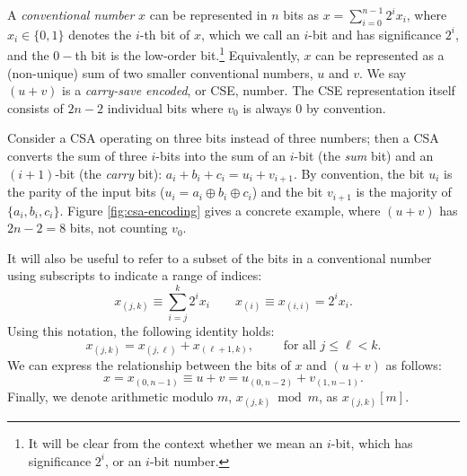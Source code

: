 \documentclass[twoside]{article}
\begin{document}
A \emph{conventional number} $x$ can be represented in $n$ bits as
$x = \sum_{i=0}^{n-1} 2^i x_i$,
where $x_i \in \{0,1\}$ denotes the $i$-th bit of $x$, which we call
an $i$-bit and has significance $2^i$, and the $0-$th bit is the low-order bit.\footnote{It will be clear from the context whether we mean an
$i$-bit, which has significance $2^i$, or an $i$-bit number.}
Equivalently, $x$ can be represented as a (non-unique)
sum of two smaller conventional numbers, $u$ and $v$.
We say $(u+v)$ is a \emph{carry-save encoded}, or CSE, number.
The CSE representation itself consists of $2n-2$ individual
bits where $v_0$ is always $0$ by convention.

Consider a CSA operating on three bits instead of three numbers; 
then a CSA converts the sum of three
$i$-bits into the sum of an $i$-bit (the \emph{sum} bit) and an $(i+1)$-bit
(the \emph{carry} bit):
$a_i+b_i+c_i = u_i+v_{i+1}$.
By convention, the bit $u_i$ is the parity of the input bits
($u_i = a_i \oplus b_i \oplus c_i$) and
the bit $v_{i+1}$ is the majority of $\{a_i, b_i, c_i\}$.
Figure \ref{fig:csa-encoding} gives a concrete example, where
$(u+v)$ has $2n-2 = 8$ bits, not counting $v_0$.

%
It will also be useful to refer to a subset of the bits in a conventional
number using subscripts to indicate a range of indices:
\begin{equation}
x_{(j,k)} \equiv \sum_{i=j}^k 2^ix_i \qquad
x_{(i)} \equiv x_{(i,i)} = 2^ix_i.
\end{equation}
%
Using this notation, the following identity holds:
\begin{equation}
x_{(j,k)} = x_{(j,\ell)} + x_{(\ell+1,k)}, \qquad \text{ for all } j \le \ell < k.
\end{equation}
%
We can express the relationship between the bits of $x$ and $(u+v)$ as follows:
%
\begin{equation}
x = x_{(0,n-1)} \equiv u+v = u_{(0,n-2)} + v_{(1,n-1)}.
\end{equation}
%
Finally, we denote arithmetic modulo $m$, $x_{(j,k)} \bmod m$, as
$x_{(j,k)}[m]$.
\end{document}
